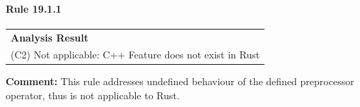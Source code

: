 \paragraph{Rule 19.1.1}
\begin{longtable}{p{13cm}}
\textbf{Analysis Result} \\
(C2) Not applicable: C++ Feature does not exist in Rust \\
\end{longtable}
\textbf{Comment:} This rule addresses undefined behaviour of the defined preprocessor operator, thus is not applicable to Rust. \\
